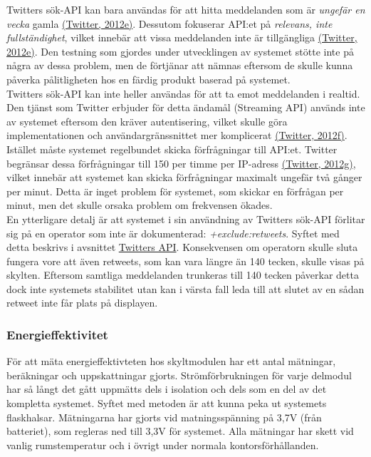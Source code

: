 \documentclass[a4paper,11pt]{article}
\begin{document}
Twitters sök-API kan bara användas för att hitta meddelanden som är {\it ungefär en vecka} gamla \hyperref[twitter]{(Twitter, 2012e)}. Dessutom fokuserar API:et på {\it relevans, inte fullständighet}, vilket innebär att vissa meddelanden inte är tillgängliga \hyperref[twitter]{(Twitter, 2012e)}. Den testning som gjordes under utvecklingen av systemet stötte inte på några av dessa problem, men de förtjänar att nämnas eftersom de skulle kunna påverka pålitligheten hos en färdig produkt baserad på systemet.\\

Twitters sök-API kan inte heller användas för att ta emot meddelanden i realtid. Den tjänst som Twitter erbjuder för detta ändamål (Streaming API) används inte av systemet eftersom den kräver autentisering, vilket skulle göra implementationen och användargränssnittet mer komplicerat \hyperref[twitter]{(Twitter, 2012f)}. Istället måste systemet regelbundet skicka förfrågningar till API:et. Twitter begränsar dessa förfrågningar till 150 per timme per IP-adress \hyperref[twitter]{(Twitter, 2012g)}, vilket innebär att systemet kan skicka förfrågningar maximalt ungefär två gånger per minut. Detta är inget problem för systemet, som skickar en förfrågan per minut, men det skulle orsaka problem om frekvensen ökades.\\

En ytterligare detalj är att systemet i sin användning av Twitters sök-API förlitar sig på en operator som inte är dokumenterad: {\it +exclude:retweets}. Syftet med detta beskrivs i avsnittet \hyperref[twitterapi]{Twitters API}. Konsekvensen om operatorn skulle sluta fungera vore att även retweets, som kan vara längre än 140 tecken, skulle visas på skylten. Eftersom samtliga meddelanden trunkeras till 140 tecken påverkar detta dock inte systemets stabilitet utan kan i värsta fall leda till att slutet av en sådan retweet inte får plats på displayen.\\

\subsubsection{Energieffektivitet}
För att mäta energieffektivteten hos skyltmodulen har ett antal mätningar, beräkningar och uppskattningar gjorts. Strömförbrukningen för varje delmodul har så långt det gått uppmätts dels i isolation och dels som en del av det kompletta systemet. Syftet med metoden är att kunna peka ut systemets flaskhalsar. Mätningarna har gjorts vid matningsspänning på 3,7V (från batteriet), som regleras ned till 3,3V för systemet. Alla mätningar har skett vid vanlig rumstemperatur och i övrigt under normala kontorsförhållanden.\\
\end{document}
